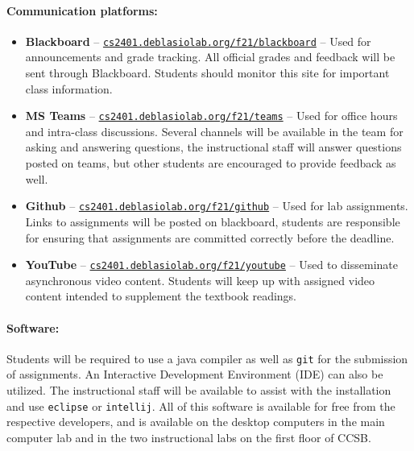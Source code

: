 \documentclass[12pt]{scrartcl}
\begin{document}
\paragraph{Communication platforms:}
\begin{itemize}
\item \textbf{Blackboard} -- \href{http://cs2401.deblasiolab.org/f21/blackboard}{\texttt{cs2401.deblasiolab.org/f21/blackboard}}  -- Used for announcements and grade tracking. All official grades and feedback will be sent through Blackboard. Students should monitor this site for important class information. 
\item \textbf{MS Teams} -- \href{http://cs2401.deblasiolab.org/f21/teams}{\texttt{cs2401.deblasiolab.org/f21/teams}}  -- Used for office hours and intra-class discussions. Several channels will be available in the team for asking and answering questions, the instructional staff will answer questions posted on teams, but other students are encouraged to provide feedback as well. 
\item \textbf{Github} -- \href{http://cs2401.deblasiolab.org/f21/github}{\texttt{cs2401.deblasiolab.org/f21/github}}  -- Used for lab assignments. Links to assignments will be posted on blackboard, students are responsible for ensuring that assignments are committed correctly before the deadline. 
\item \textbf{YouTube} -- \href{http://cs2401.deblasiolab.org/f21/youtube}{\texttt{cs2401.deblasiolab.org/f21/youtube}} -- Used to disseminate asynchronous video content. Students will keep up with assigned video content intended to supplement the textbook readings.
\end{itemize}

\paragraph{Software: } 
Students will be required to use a java compiler 
as well as \texttt{git} for the submission of assignments. 
An Interactive Development Environment (IDE) can also be utilized. The instructional staff will be available to assist with the installation and use \texttt{eclipse} or \texttt{intellij}.%
All of this software is available for free from the respective developers, and is available on the desktop computers in the main computer lab and in the two instructional labs on the first floor of CCSB. 

\end{document}
